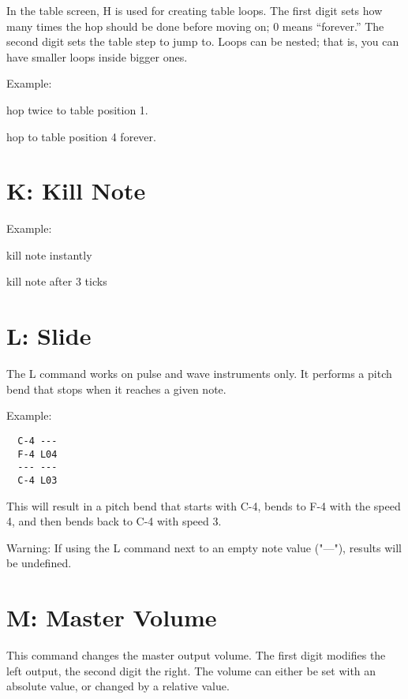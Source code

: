 In the table screen, H is used for creating table loops. The first digit sets how many times the hop should be done before moving on; 0 means ``forever.'' The second digit sets the table step to jump to. Loops can be nested; that is, you can have smaller loops inside bigger ones.

\begin{description}
\item Example:
\item[H21] hop twice to table position 1.
\item[H04] hop to table position 4 forever.
\end{description}

\section{K: Kill Note}

\begin{description}
\item Example:
\item[K00] kill note instantly
\item[K03] kill note after 3 ticks
\end{description}

\section{L: Slide}

The L command works on pulse and wave instruments only. It performs a pitch bend that stops when it reaches a given note.

Example:

\begin{verbatim}
  C-4 ---
  F-4 L04
  --- ---
  C-4 L03
\end{verbatim}

This will result in a pitch bend that starts with C-4, bends to F-4 with the speed 4, and then bends back to C-4 with speed 3.

Warning: If using the L command next to an empty note value ("---"), results will be undefined.

\section{M: Master Volume}

This command changes the master output volume. The first digit modifies the left output, the second digit the right. The volume can either be set with an absolute value, or changed by a relative value.

